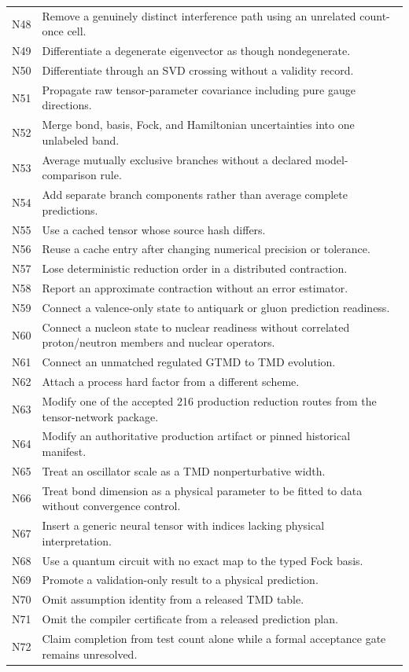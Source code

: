 \documentclass[11pt]{article}
\begin{document}
\begin{longtable}{L{0.10\textwidth}L{0.82\textwidth}}
N48 & Remove a genuinely distinct interference path using an unrelated count-once cell.\\
N49 & Differentiate a degenerate eigenvector as though nondegenerate.\\
N50 & Differentiate through an SVD crossing without a validity record.\\
N51 & Propagate raw tensor-parameter covariance including pure gauge directions.\\
N52 & Merge bond, basis, Fock, and Hamiltonian uncertainties into one unlabeled band.\\
N53 & Average mutually exclusive branches without a declared model-comparison rule.\\
N54 & Add separate branch components rather than average complete predictions.\\
N55 & Use a cached tensor whose source hash differs.\\
N56 & Reuse a cache entry after changing numerical precision or tolerance.\\
N57 & Lose deterministic reduction order in a distributed contraction.\\
N58 & Report an approximate contraction without an error estimator.\\
N59 & Connect a valence-only state to antiquark or gluon prediction readiness.\\
N60 & Connect a nucleon state to nuclear readiness without correlated proton/neutron members and nuclear operators.\\
N61 & Connect an unmatched regulated GTMD to TMD evolution.\\
N62 & Attach a process hard factor from a different scheme.\\
N63 & Modify one of the accepted 216 production reduction routes from the tensor-network package.\\
N64 & Modify an authoritative production artifact or pinned historical manifest.\\
N65 & Treat an oscillator scale as a TMD nonperturbative width.\\
N66 & Treat bond dimension as a physical parameter to be fitted to data without convergence control.\\
N67 & Insert a generic neural tensor with indices lacking physical interpretation.\\
N68 & Use a quantum circuit with no exact map to the typed Fock basis.\\
N69 & Promote a validation-only result to a physical prediction.\\
N70 & Omit assumption identity from a released TMD table.\\
N71 & Omit the compiler certificate from a released prediction plan.\\
N72 & Claim completion from test count alone while a formal acceptance gate remains unresolved.\\
\bottomrule
\end{longtable}
\end{document}
